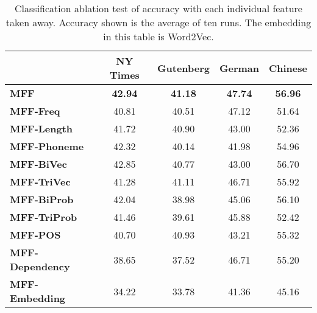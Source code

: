 \begin{table}[ht]
	\scriptsize
	\setlength{\abovecaptionskip}{0pt}
	\setlength{\belowcaptionskip}{0pt}
	\begin{center}
		\begin{tabular}{lcccc}
		\toprule[1pt]
		&\textbf{NY Times} & \textbf{Gutenberg} & \textbf{German} & \textbf{Chinese} \\ 
		\midrule
	\textbf{MFF}&     \textbf{42.94 }       &   \textbf{41.18 }   &\textbf{47.74 }     &    \textbf{56.96} \\ 
	\midrule
		\textbf{MFF-Freq}     &      40.81     &     40.51 &      47.12      &  51.64  \\ 
	\textbf{MFF-Length}      &    41.72  &  40.90       &  43.00       &  52.36 \\ 
	\textbf{MFF-Phoneme}   &       42.32         &   40.14     &      41.98       &   54.96    \\ 
	\textbf{MFF-BiVec}    &        42.85   &40.77 &       43.00     &    56.70   \\ 
		\textbf{MFF-TriVec}   &         41.28  &   41.11   &46.71     &    55.92   \\ 
	\textbf{MFF-BiProb}    &          42.04     &       38.98   &      45.06        &   56.10  \\ 
		\textbf{MFF-TriProb}  &    41.46         &	39.61       &       45.88      &  52.42   \\ 
	\textbf{MFF-POS}      &      40.70      &      40.93   &       43.21   & 55.32 \\ 
	\textbf{MFF-Dependency}&     38.65               &  37.52   &      46.71      &   55.20    \\ 
		\textbf{MFF-Embedding} &34.22                  & 33.78      & 41.36     &   45.16  \\ 
		\bottomrule[1pt]
	\end{tabular}
	\end{center}
\caption{\label{tab:featurecompare} Classification ablation test of accuracy with each individual feature taken away. 
	Accuracy shown is the average of ten runs. The embedding in this table is Word2Vec.}
\end{table}


